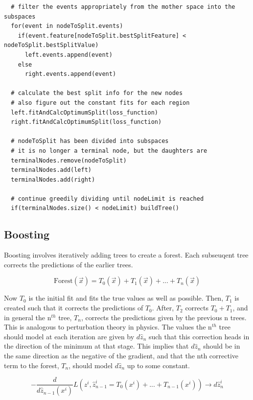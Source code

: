 \documentclass[12pt]{article}
\begin{document}
\begin{verbatim}
  # filter the events appropriately from the mother space into the subspaces
  for(event in nodeToSplit.events)
    if(event.feature[nodeToSplit.bestSplitFeature] < nodeToSplit.bestSplitValue)
      left.events.append(event)
    else 
      right.events.append(event)

  # calculate the best split info for the new nodes
  # also figure out the constant fits for each region
  left.fitAndCalcOptimumSplit(loss_function)
  right.fitAndCalcOptimumSplit(loss_function)

  # nodeToSplit has been divided into subspaces
  # it is no longer a terminal node, but the daughters are
  terminalNodes.remove(nodeToSplit)
  terminalNodes.add(left)
  terminalNodes.add(right)

  # continue greedily dividing until nodeLimit is reached
  if(terminalNodes.size() < nodeLimit) buildTree()

\end{verbatim}

\subsection{Boosting}

Boosting involves iteratively adding trees to create a forest. Each subseuqent tree corrects the predictions of the earlier trees. 

\begin{equation}
\textrm{Forest}(\vec{x}) = T_0(\vec{x}) + T_1(\vec{x}) + ... + T_n(\vec{x})
\end{equation}

Now $T_0$ is the initial fit and fits the true values as well as possible. Then, $T_1$ is created such that it corrects the predictions of $T_0$. After, $T_2$ corrects $T_0 + T_1$, and in general the n$^{th}$ tree, $T_n$, corrects the predictions given by the previous n trees. This is analogous to perturbation theory in physics. The values the n$^{th}$ tree should model at each iteration are given by $d\hat{z}_{n}$ such that this correction heads in the direction of the minimum at that stage. This implies that $d\hat{z}_{n}$ should be in the same direction as the negative of the gradient, and that the nth corrective term to the forest, $T_n$, should model $d\hat{z}_{n}$ up to some constant.

\begin{equation}
-\frac{d}{d\hat{z}_{n-1}(x^i)}L(z^i,\hat{z}^i_{n-1} = T_0(x^i)+...+T_{n-1}(x^i)) \rightarrow d\hat{z}^{i}_{n}
\end{equation}
\end{document}
